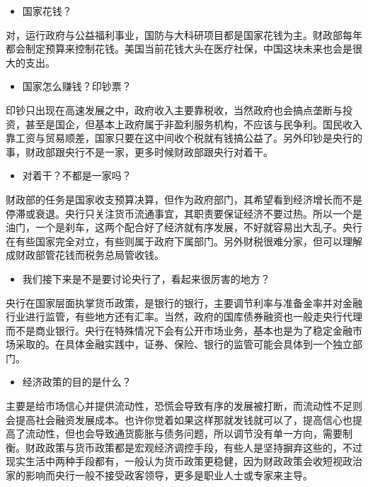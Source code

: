 \documentclass[
  letterpaper,
  DIV=11,
  numbers=noendperiod]{scrreprt}
\providecommand{\tightlist}{%
  \setlength{\itemsep}{0pt}\setlength{\parskip}{0pt}}\usepackage{longtable,booktabs,array}
\begin{document}
\begin{itemize}
\tightlist
\item
  国家花钱？
\end{itemize}

对，运行政府与公益福利事业，国防与大科研项目都是国家花钱为主。财政部每年都会制定预算来控制花钱。美国当前花钱大头在医疗社保，中国这块未来也会是很大的支出。

\begin{itemize}
\tightlist
\item
  国家怎么赚钱？印钞票？
\end{itemize}

印钞只出现在高速发展之中，政府收入主要靠税收，当然政府也会搞点垄断与投资，甚至是国企，但基本上政府属于非盈利服务机构，不应该与民争利。国民收入靠工资与贸易顺差，国家只要在这中间收个税就有钱搞公益了。另外印钞是央行的事，财政部跟央行不是一家，更多时候财政部跟央行对着干。

\begin{itemize}
\tightlist
\item
  对着干？不都是一家吗？
\end{itemize}

财政部的任务是国家收支预算决算，但作为政府部门，其希望看到经济增长而不是停滞或衰退。央行只关注货币流通事宜，其职责要保证经济不要过热。所以一个是油门，一个是刹车，这两个配合好了经济就有序发展，不好就容易出大乱子。央行在有些国家完全对立，有些则属于政府下属部门。另外财税很难分家，但可以理解成财政部管花钱而税务总局管收钱。

\begin{itemize}
\tightlist
\item
  我们接下来是不是要讨论央行了，看起来很厉害的地方？
\end{itemize}

央行在国家层面执掌货币政策，是银行的银行，主要调节利率与准备金率并对金融行业进行监管，有些地方还有汇率。当然，政府的国库债券融资也一般走央行代理而不是商业银行。央行在特殊情况下会有公开市场业务，基本也是为了稳定金融市场采取的。在具体金融实践中，证券、保险、银行的监管可能会具体到一个独立部门。

\begin{itemize}
\tightlist
\item
  经济政策的目的是什么？
\end{itemize}

主要是给市场信心并提供流动性，恐慌会导致有序的发展被打断，而流动性不足则会提高社会融资发展成本。也许你觉着如果这样那就发钱就可以了，提高信心也提高了流动性，但也会导致通货膨胀与债务问题，所以调节没有单一方向，需要制衡。财政政策与货币政策都是宏观经济调控手段，有些人是坚持摒弃这些的，不过现实生活中两种手段都有，一般认为货币政策更稳健，因为财政政策会收短视政治家的影响而央行一般不接受政客领导，更多是职业人士或专家来主导。
\end{document}
